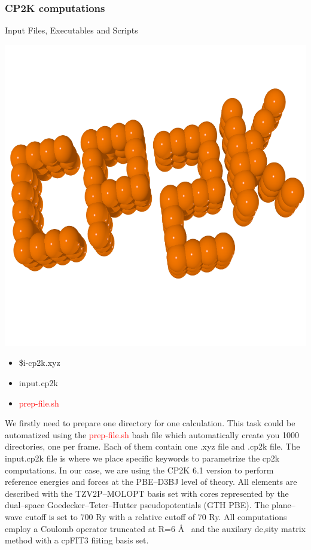 \documentclass[12pt]{article}
\begin{document}
\subsubsection{CP2K computations}
\begin{mybox2}{{Input Files, Executables and Scripts}}
\begin{minipage}[c]{0.5\linewidth}
\includegraphics[scale=0.1]{CP2K_logo.png}
\end{minipage}
\begin{minipage}[c]{0.5\linewidth}
\begin{itemize}
    \item \$i-cp2k.xyz
    \item input.cp2k
    \item \textcolor{red}{prep-file.sh}
\end{itemize}
\end{minipage}
\end{mybox2}
We firstly need to prepare one directory for one calculation. This task could be automatized using the \textcolor{red}{prep-file.sh} bash file which automatically create you 1000 directories, one per frame. Each of them contain one .xyz file and .cp2k file. The input.cp2k file is where we place specific keywords to parametrize the cp2k computations. In our case, we are using the CP2K 6.1 version to perform reference energies and forces at the PBE--D3BJ level of theory. All elements are described with the TZV2P--MOLOPT basis set with cores represented by the dual--space Goedecker--Teter--Hutter pseudopotentials (GTH PBE). The plane--wave cutoff is set to 700 Ry with a relative cutoff of 70 Ry. All computations employ a Coulomb operator truncated at R=6 \AA~ and the auxilary de,sity matrix method with a cpFIT3 fiiting basis set. \\ \\
\end{document}
